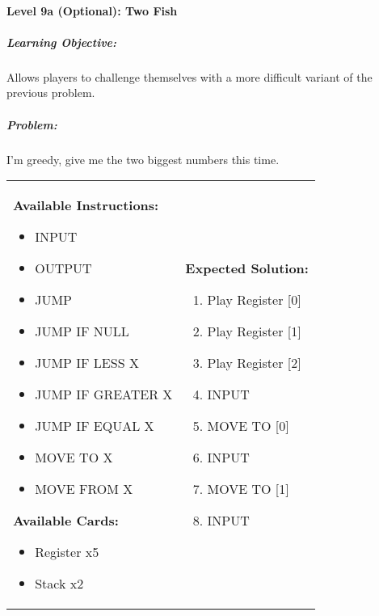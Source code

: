\paragraph{Level 9a (Optional): Two Fish}
\subparagraph{Learning Objective:} Allows players to challenge themselves with a more difficult variant of the previous problem.

\subparagraph{Problem:} I'm greedy, give me the two biggest numbers this time.

\begin{center}
    \begin{tabular}{ | m{6cm} | m{8cm} | } 
        \hline
            \textbf{Available Instructions:} 
            \begin{itemize}
                \setlength\itemsep{-.35em}
                \item INPUT
                \item OUTPUT
                \item JUMP
                \item JUMP IF NULL
                \item JUMP IF LESS X
                \item JUMP IF GREATER X
		\item JUMP IF EQUAL X
                \item MOVE TO X
                \item MOVE FROM X
            \end{itemize}
            \textbf{Available Cards:} 
            \begin{itemize}
                \setlength\itemsep{-.35em}
                \item Register x5
                \item Stack x2
            \end{itemize}& 
            \textbf{Expected Solution:} 
            \begin{enumerate}
                \setlength\itemsep{-.35em}
                \item Play Register [0]
                \item Play Register [1]
                \item Play Register [2]
                \item INPUT
                \item MOVE TO [0]
                \item INPUT
                \item MOVE TO [1]
                \item INPUT

\end{enumerate}
\end{tabular}
\end{center}
